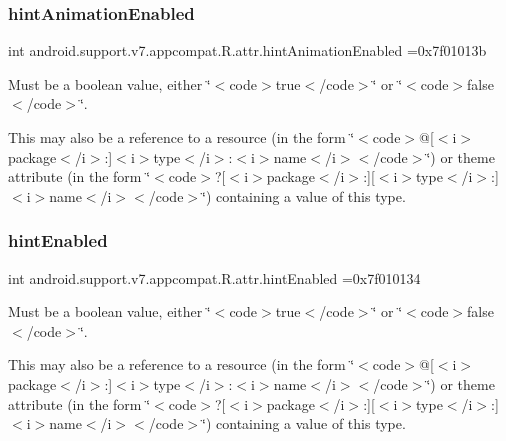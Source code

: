 \subsubsection{\texorpdfstring{hint\+Animation\+Enabled}{hintAnimationEnabled}}
{\footnotesize\ttfamily int android.\+support.\+v7.\+appcompat.\+R.\+attr.\+hint\+Animation\+Enabled =0x7f01013b\hspace{0.3cm}{\ttfamily [static]}}

Must be a boolean value, either \char`\"{}$<$code$>$true$<$/code$>$\char`\"{} or \char`\"{}$<$code$>$false$<$/code$>$\char`\"{}. 

This may also be a reference to a resource (in the form \char`\"{}$<$code$>$@\mbox{[}$<$i$>$package$<$/i$>$\+:\mbox{]}$<$i$>$type$<$/i$>$\+:$<$i$>$name$<$/i$>$$<$/code$>$\char`\"{}) or theme attribute (in the form \char`\"{}$<$code$>$?\mbox{[}$<$i$>$package$<$/i$>$\+:\mbox{]}\mbox{[}$<$i$>$type$<$/i$>$\+:\mbox{]}$<$i$>$name$<$/i$>$$<$/code$>$\char`\"{}) containing a value of this type. \mbox{\label{classandroid_1_1support_1_1v7_1_1appcompat_1_1R_1_1attr_a25854ee3954a7a1193b311c5af21a879}} 
\subsubsection{\texorpdfstring{hint\+Enabled}{hintEnabled}}
{\footnotesize\ttfamily int android.\+support.\+v7.\+appcompat.\+R.\+attr.\+hint\+Enabled =0x7f010134\hspace{0.3cm}{\ttfamily [static]}}

Must be a boolean value, either \char`\"{}$<$code$>$true$<$/code$>$\char`\"{} or \char`\"{}$<$code$>$false$<$/code$>$\char`\"{}. 

This may also be a reference to a resource (in the form \char`\"{}$<$code$>$@\mbox{[}$<$i$>$package$<$/i$>$\+:\mbox{]}$<$i$>$type$<$/i$>$\+:$<$i$>$name$<$/i$>$$<$/code$>$\char`\"{}) or theme attribute (in the form \char`\"{}$<$code$>$?\mbox{[}$<$i$>$package$<$/i$>$\+:\mbox{]}\mbox{[}$<$i$>$type$<$/i$>$\+:\mbox{]}$<$i$>$name$<$/i$>$$<$/code$>$\char`\"{}) containing a value of this type. \mbox{\label{classandroid_1_1support_1_1v7_1_1appcompat_1_1R_1_1attr_ae5b2a2b9f322fa06f784d73f1e4ac50c}} 

